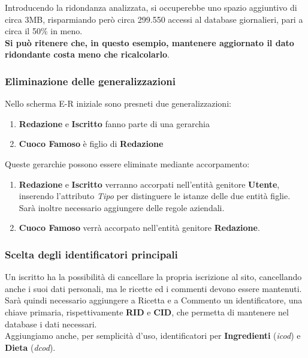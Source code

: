 \documentclass[12pt]{extarticle}
\begin{document}
Introducendo la ridondanza analizzata, si occuperebbe uno spazio aggiuntivo di circa
3MB, risparmiando però circa 299.550 accessi al database giornalieri, pari a circa il 50\% in meno.\\
\textbf{Si può ritenere che, in questo esempio, mantenere aggiornato il dato ridondante costa
meno che ricalcolarlo}.

\newpage

\subsubsection{Eliminazione delle generalizzazioni}

Nello scherma E-R iniziale sono presneti due generalizzazioni:
\begin{enumerate}
    \item \textbf{Redazione} e \textbf{Iscritto} fanno parte di una gerarchia
    \item \textbf{Cuoco Famoso} è figlio di \textbf{Redazione}
\end{enumerate}

Queste gerarchie possono essere eliminate mediante accorpamento:
\begin{enumerate}
    \item \textbf{Redazione} e \textbf{Iscritto} verranno accorpati nell'entità genitore \textbf{Utente}, inserendo l'attributo \textit{Tipo} per distinguere le istanze delle due entità figlie. Sarà inoltre necessario aggiungere delle regole aziendali.
    \item \textbf{Cuoco Famoso} verrà accorpato nell'entità genitore \textbf{Redazione}.
\end{enumerate}

\subsubsection{Scelta degli identificatori principali}

Un iscritto ha la possibilità di cancellare la propria iscrizione al sito, 
cancellando anche i  suoi dati personali, ma le ricette ed i commenti devono essere mantenuti.
Sarà quindi necessario aggiungere a Ricetta e a Commento un identificatore, una chiave primaria,
rispettivamente \textbf{RID} e \textbf{CID}, che permetta di mantenere nel database i dati necessari.
\\
Aggiungiamo anche, per semplicità d'uso, identificatori per \textbf{Ingredienti} (\textit{icod}) e \textbf{Dieta} (\textit{dcod}).
\end{document}
